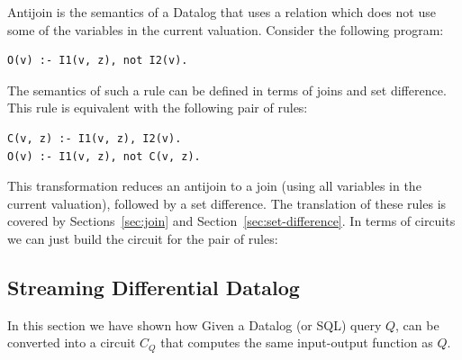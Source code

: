 Antijoin is the semantics of a Datalog  that uses a relation
which does not use some of the variables in the current valuation.
Consider the following program:

\begin{lstlisting}[language=ddlog]
O(v) :- I1(v, z), not I2(v).     
\end{lstlisting}

The semantics of such a rule can be defined in terms of joins and set difference.
This rule is equivalent with the following pair of rules:

\begin{lstlisting}[language=ddlog]
C(v, z) :- I1(v, z), I2(v).
O(v) :- I1(v, z), not C(v, z).     
\end{lstlisting}

This transformation reduces an antijoin to a join (using all variables in the current valuation), 
followed by a set difference.  The translation of these rules is covered by Sections~\ref{sec:join} and
Section~\ref{sec:set-difference}.  In terms of circuits we can just build the circuit 
for the pair of rules:


\subsection{Streaming Differential Datalog}\label{sec:ddlog}

In this section we have shown how Given a Datalog (or SQL) query $Q$, 
can be converted into a circuit $C_Q$ that computes the same input-output function as $Q$.  


